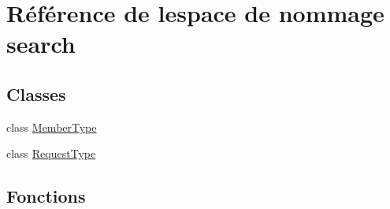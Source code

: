 \hypertarget{namespacesearch}{}\section{Référence de l\textquotesingle{}espace de nommage search}
\label{namespacesearch}
\subsection*{Classes}
\begin{DoxyCompactItemize}
\item 
class \hyperlink{classsearch_1_1_member_type}{Member\+Type}
\item 
class \hyperlink{classsearch_1_1_request_type}{Request\+Type}
\end{DoxyCompactItemize}
\subsection*{Fonctions}
